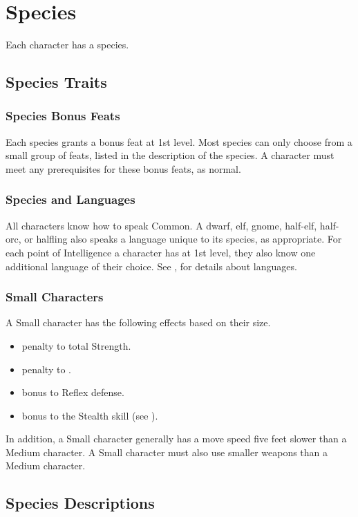 \chapter{Species}\label{Species}

Each character has a species.

\section{Species Traits}

\subsection{Species Bonus Feats}\label{Species Bonus Feats}
Each species grants a bonus feat at 1st level. Most species can only choose from a small group of feats, listed in the description of the species. A character must meet any prerequisites for these bonus feats, as normal.

\subsection{Species and Languages}
All characters know how to speak Common. A dwarf, elf, gnome, half-elf, half-orc, or halfling also speaks a language unique to its species, as appropriate. For each point of Intelligence a character has at 1st level, they also know one additional language of their choice. See , for details about languages.

\subsection{Small Characters}\label{Small Characters}
A Small character has the following effects based on their size.
\begin{itemize}
    \item {} penalty to total Strength.
    \item {} penalty to .
    \item {} bonus to Reflex defense.
    \item {} bonus to the Stealth skill (see ).
\end{itemize}

In addition, a Small character generally has a move speed five feet slower than a Medium character. A Small character must also use smaller weapons than a Medium character.

\section{Species Descriptions}

